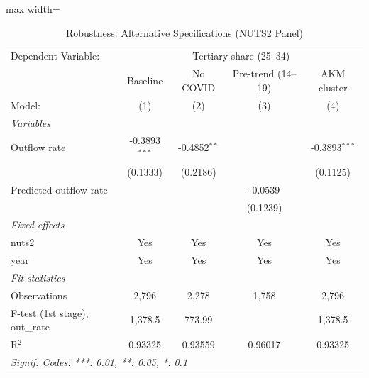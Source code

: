 \begin{table}[htbp]
   \caption{\label{tab:robustness} Robustness: Alternative Specifications (NUTS2 Panel)}
   \centering
   \scriptsize
   \begin{adjustbox}{max width=\textwidth}
   \begin{tabular}{lcccc}
      \tabularnewline \midrule \midrule
      Dependent Variable: & \multicolumn{4}{c}{Tertiary share (25--34)}\\
                                     & Baseline        & No COVID       & Pre-trend (14--19) & AKM cluster \\   
      Model:                         & (1)             & (2)            & (3)                & (4)\\  
      \midrule
      \emph{Variables}\\
      Outflow rate                   & -0.3893$^{***}$ & -0.4852$^{**}$ &                    & -0.3893$^{***}$\\   
                                     & (0.1333)        & (0.2186)       &                    & (0.1125)\\   
      Predicted outflow rate         &                 &                & -0.0539            &   \\   
                                     &                 &                & (0.1239)           &   \\   
      \midrule
      \emph{Fixed-effects}\\
      nuts2                          & Yes             & Yes            & Yes                & Yes\\  
      year                           & Yes             & Yes            & Yes                & Yes\\  
      \midrule
      \emph{Fit statistics}\\
      Observations                   & 2,796           & 2,278          & 1,758              & 2,796\\  
      F-test (1st stage), out\_rate  & 1,378.5         & 773.99         &                    & 1,378.5\\  
      R$^2$                          & 0.93325         & 0.93559        & 0.96017            & 0.93325\\  
      \midrule \midrule
      \multicolumn{5}{l}{\emph{Signif. Codes: ***: 0.01, **: 0.05, *: 0.1}}\\
   \end{tabular}
   \end{adjustbox}
\end{table}
